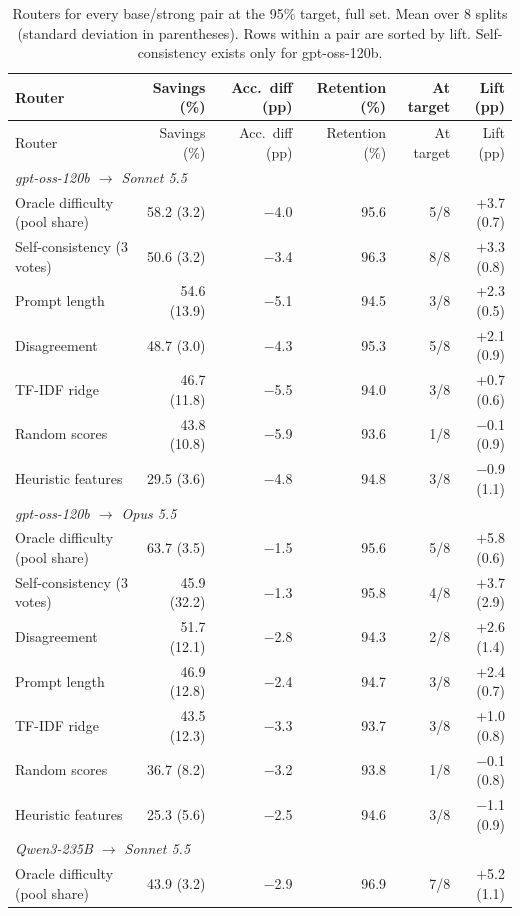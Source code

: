 \begin{longtable}{lrrrrr}
\caption{Routers for every base/strong pair at the 95\% target, full set. Mean over 8 splits (standard deviation in parentheses). Rows within a pair are sorted by lift. Self-consistency exists only for gpt-oss-120b.}\label{tab:pairs_95}\\
\toprule
Router & Savings (\%) & Acc.\ diff (pp) & Retention (\%) & At target & Lift (pp) \\
\midrule
\endfirsthead
\toprule
Router & Savings (\%) & Acc.\ diff (pp) & Retention (\%) & At target & Lift (pp) \\
\midrule
\endhead
\multicolumn{6}{l}{\emph{gpt-oss-120b $\to$ Sonnet 5.5}} \\
Oracle difficulty (pool share) & 58.2 (3.2) & $-$4.0 & 95.6 & 5/8 & +3.7 (0.7) \\
Self-consistency (3 votes) & 50.6 (3.2) & $-$3.4 & 96.3 & 8/8 & +3.3 (0.8) \\
Prompt length & 54.6 (13.9) & $-$5.1 & 94.5 & 3/8 & +2.3 (0.5) \\
Disagreement & 48.7 (3.0) & $-$4.3 & 95.3 & 5/8 & +2.1 (0.9) \\
TF-IDF ridge & 46.7 (11.8) & $-$5.5 & 94.0 & 3/8 & +0.7 (0.6) \\
Random scores & 43.8 (10.8) & $-$5.9 & 93.6 & 1/8 & $-$0.1 (0.9) \\
Heuristic features & 29.5 (3.6) & $-$4.8 & 94.8 & 3/8 & $-$0.9 (1.1) \\
\midrule
\multicolumn{6}{l}{\emph{gpt-oss-120b $\to$ Opus 5.5}} \\
Oracle difficulty (pool share) & 63.7 (3.5) & $-$1.5 & 95.6 & 5/8 & +5.8 (0.6) \\
Self-consistency (3 votes) & 45.9 (32.2) & $-$1.3 & 95.8 & 4/8 & +3.7 (2.9) \\
Disagreement & 51.7 (12.1) & $-$2.8 & 94.3 & 2/8 & +2.6 (1.4) \\
Prompt length & 46.9 (12.8) & $-$2.4 & 94.7 & 3/8 & +2.4 (0.7) \\
TF-IDF ridge & 43.5 (12.3) & $-$3.3 & 93.7 & 3/8 & +1.0 (0.8) \\
Random scores & 36.7 (8.2) & $-$3.2 & 93.8 & 1/8 & $-$0.1 (0.8) \\
Heuristic features & 25.3 (5.6) & $-$2.5 & 94.6 & 3/8 & $-$1.1 (0.9) \\
\midrule
\multicolumn{6}{l}{\emph{Qwen3-235B $\to$ Sonnet 5.5}} \\
Oracle difficulty (pool share) & 43.9 (3.2) & $-$2.9 & 96.9 & 7/8 & +5.2 (1.1) \\

\end{longtable}
